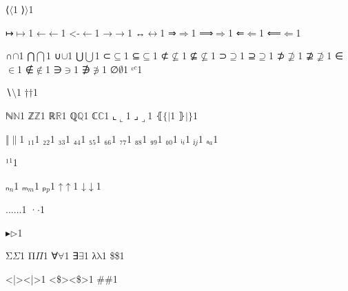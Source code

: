 {%
{⟨}{{\ensuremath{\langle}}}1
{⟩}{{\ensuremath{\rangle}}}1

{↦}{{\ensuremath{\mapsto}}}1
{←}{{\ensuremath{\leftarrow}}}1
{<-}{{\ensuremath{\leftarrow}}}1
{→}{{\ensuremath{\rightarrow}}}1
{↔}{{\ensuremath{\leftrightarrow}}}1
{⇒}{{\ensuremath{\Rightarrow}}}1
{⟹}{{\ensuremath{\Longrightarrow}}}1
{⇐}{{\ensuremath{\Leftarrow}}}1
{⟸}{{\ensuremath{\Longleftarrow}}}1

{∩}{{\ensuremath{\cap}}}1
{⋂}{{\ensuremath{\bigcap}}}1
{∪}{{\ensuremath{\cup}}}1
{⋃}{{\ensuremath{\bigcup}}}1
{⊂}{{\ensuremath{\subseteq}}}1
{⊆}{{\ensuremath{\subseteq}}}1
{⊄}{{\ensuremath{\nsubseteq}}}1
{⊈}{{\ensuremath{\nsubseteq}}}1
{⊃}{{\ensuremath{\supseteq}}}1
{⊇}{{\ensuremath{\supseteq}}}1
{⊅}{{\ensuremath{\nsupseteq}}}1
{⊉}{{\ensuremath{\nsupseteq}}}1
{∈}{{\ensuremath{\in}}}1
{∉}{{\ensuremath{\notin}}}1
{∋}{{\ensuremath{\ni}}}1
{∌}{{\ensuremath{\notni}}}1
{∅}{{\ensuremath{\emptyset}}}1
{ᶜ}{{\ensuremath{^{c}}}}1

{∖}{{\ensuremath{\setminus}}}1
{†}{{\ensuremath{\dag}}}1

{ℕ}{{\ensuremath{\mathbb{N}}}}1
{ℤ}{{\ensuremath{\mathbb{Z}}}}1
{ℝ}{{\ensuremath{\mathbb{R}}}}1
{ℚ}{{\ensuremath{\mathbb{Q}}}}1
{ℂ}{{\ensuremath{\mathbb{C}}}}1
{⌞}{{\ensuremath{\llcorner}}}1
{⌟}{{\ensuremath{\lrcorner}}}1
{⦃}{{\ensuremath{\{\!|}}}1
{⦄}{{\ensuremath{|\!\}}}}1

{‖}{{\ensuremath{\|}}}1
{₁}{{\ensuremath{_1}}}1
{₂}{{\ensuremath{_2}}}1
{₃}{{\ensuremath{_3}}}1
{₄}{{\ensuremath{_4}}}1
{₅}{{\ensuremath{_5}}}1
{₆}{{\ensuremath{_6}}}1
{₇}{{\ensuremath{_7}}}1
{₈}{{\ensuremath{_8}}}1
{₉}{{\ensuremath{_9}}}1
{₀}{{\ensuremath{_0}}}1
{ᵢ}{{\ensuremath{_i}}}1
{ⱼ}{{\ensuremath{_j}}}1
{ₐ}{{\ensuremath{_a}}}1

{¹}{{\ensuremath{^1}}}1

{ₙ}{{\ensuremath{_n}}}1
{ₘ}{{\ensuremath{_m}}}1
{ₚ}{{\ensuremath{_p}}}1
{↑}{{\ensuremath{\uparrow}}}1
{↓}{{\ensuremath{\downarrow}}}1

{...}{{\ensuremath{\ldots}}}1
{·}{{\ensuremath{\cdot}}}1

{▸}{{\ensuremath{\triangleright}}}1

{Σ}{{\ensuremath{\Sigma}}}1
{Π}{{\ensuremath{\Pi}}}1
{∀}{{\ensuremath{\forall}}}1
{∃}{{\ensuremath{\exists}}}1
{λ}{{\ensuremath{\mathrm{\lambda}}}}1
{\$}{{\$}}1

{<|>}{{\color{symbolcolor}<|>}}1
{<\$>}{{\color{symbolcolor}<\$>}}1
{\#}{{\color{symbolcolor}\#}}1

}
